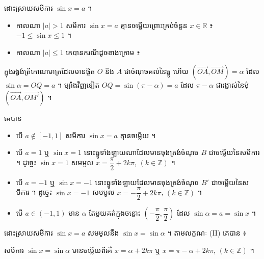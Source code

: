 \begin{example}[ឧទាហរណ៍ ២]
ដោះស្រាយសមីការ $\sin x = a$ ។
\begin{itemize}
  \item កាលណា $|a| > 1$ សមីការ $\sin x = a$ គ្មានចម្លើយព្រោះគ្រប់ចំនួន $x \in \mathbb{R}$ ៖ $-1 \le \sin x \le 1$ ។
  \item កាលណា $|a| \le 1$ គេបានករណីដូចខាងក្រោម ៖
\end{itemize}
ក្នុងរង្វង់ត្រីកោណមាត្រដែលមានផ្ចិត $O$ និង $A$ ជាចំណុចគល់នៃធ្នូ ហើយ $(\overrightarrow{OA}, \overrightarrow{OM}) = \alpha$ ដែល $\sin\alpha = OQ = a$ ។ ម្យ៉ាងវិញទៀត $OQ = \sin(\pi - \alpha) = a$ ដែល $\pi - \alpha$ ជារង្វាស់នៃមុំ $(\overrightarrow{OA}, \overrightarrow{OM'})$ ។
\begin{center}
\end{center}
គេបាន
\begin{itemize}
  \item បើ $a \notin [-1, 1]$ សមីការ $\sin x = a$ គ្មានចម្លើយ ។
  \item បើ $a = 1$ ឬ $\sin x = 1$ នោះធ្នូទាំងឡាយណាដែលមានចុងត្រង់ចំណុច $B$ ជាចម្លើយនៃសមីការ ។ ដូច្នេះ $\sin x = 1$ សមមូល $x = \dfrac{\pi}{2} + 2k\pi$, $(k \in \mathbb{Z})$ ។
  \item បើ $a = -1$ ឬ $\sin x = -1$ នោះធ្នូទាំងឡាយដែលមានចុងត្រង់ចំណុច $B'$ ជាចម្លើយនៃសមីការ ។ ដូច្នេះ $\sin x = -1$ សមមូល $x = -\dfrac{\pi}{2} + 2k\pi$, $(k \in \mathbb{Z})$ ។
  \item បើ $a \in (-1, 1)$ មាន $\alpha$ តែមួយគត់ក្នុងចន្លោះ $\left(-\dfrac{\pi}{2}, \dfrac{\pi}{2}\right)$ ដែល $\sin\alpha = a = \sin x$ ។
\end{itemize}
ដោះស្រាយសមីការ $\sin x = a$ សមមូលនឹង $\sin x = \sin\alpha$ ។ តាមលក្ខណៈ (II) គេបាន ៖
\end{example}

\begin{formulaBox}[សមីការ $\sin x = \sin\alpha$]
សមីការ $\sin x = \sin\alpha$ មានចម្លើយពីរគឺ $x = \alpha + 2k\pi$ ឬ $x = \pi - \alpha + 2k\pi$, $(k \in \mathbb{Z})$ ។
\end{formulaBox}

